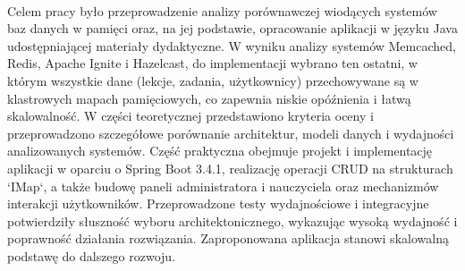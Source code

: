 %


\begin{center}
\\[1cm] 



Celem pracy było przeprowadzenie analizy porównawczej wiodących systemów baz danych w pamięci oraz, na jej podstawie, opracowanie aplikacji w języku Java udostępniającej materiały dydaktyczne.
W wyniku analizy systemów Memcached, Redis, Apache Ignite i Hazelcast, do implementacji wybrano ten ostatni, w którym wszystkie dane (lekcje, zadania, użytkownicy) przechowywane są w klastrowych mapach pamięciowych, co zapewnia niskie opóźnienia i łatwą skalowalność.
W części teoretycznej przedstawiono kryteria oceny i przeprowadzono szczegółowe porównanie architektur, modeli danych i wydajności analizowanych systemów.
Część praktyczna obejmuje projekt i implementację aplikacji w oparciu o Spring Boot 3.4.1, realizację operacji CRUD na strukturach `IMap`, a także budowę paneli administratora i nauczyciela oraz mechanizmów interakcji użytkowników.
Przeprowadzone testy wydajnościowe i integracyjne potwierdziły słuszność wyboru architektonicznego, wykazując wysoką wydajność i poprawność działania rozwiązania.
Zaproponowana aplikacja stanowi skalowalną podstawę do dalszego rozwoju.


\end{center}

